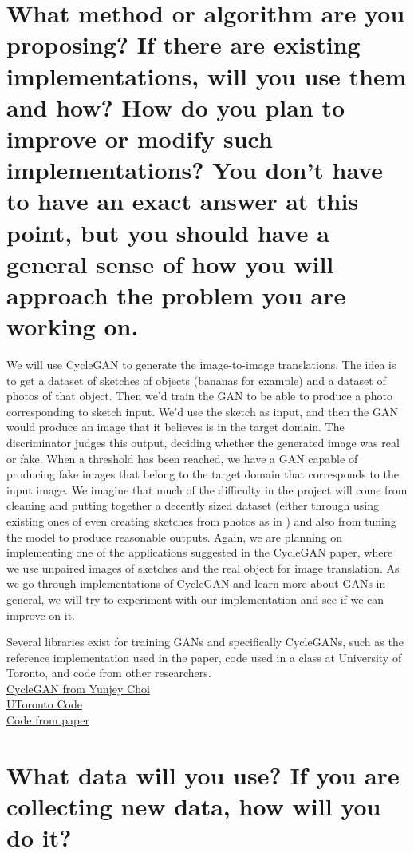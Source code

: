 \documentclass{article}
\begin{document}
\section{What method or algorithm are you proposing? If there are existing implementations, will you use them and how? How do you plan to improve or modify such implementations? You don't have to have an exact answer at this point, but you should have a general sense of how you will approach the problem you are working on. }

We will use CycleGAN to generate the image-to-image translations.
The idea is to get a dataset of sketches of objects (bananas for example) and a dataset of photos of that object.
Then we'd train the GAN to be able to produce a photo corresponding to sketch input. 
We'd use the sketch as input, and then the GAN would produce an image that it believes is in the target domain. 
The discriminator judges this output, deciding whether the generated image was real or fake.
When a threshold has been reached, we have a GAN capable of producing fake images that belong to the target domain that corresponds to the input image.
We imagine that much of the difficulty in the project will come from cleaning and putting together a decently sized dataset (either through using existing ones of even creating sketches from photos as in \cite{pix2pix}) and also from tuning the model to produce reasonable outputs.
Again, we are planning on implementing one of the applications suggested in the CycleGAN paper, where we use unpaired images of sketches and the real object for image translation.
As we go through implementations of CycleGAN and learn more about GANs in general, we will try to experiment with our implementation and see if we can improve on it.

Several libraries exist for training GANs and specifically CycleGANs, such as the reference implementation used in the paper, code used in a class at University of Toronto, and code from other researchers. \\
\href{https://github.com/yunjey/mnist-svhn-transfer}{CycleGAN from Yunjey Choi} \\
\href{www.cs.toronto.edu/~rgrosse/courses/csc321_2018/assignments/a4-code.zip}{UToronto Code} \\
\href{https://github.com/junyanz/pytorch-CycleGAN-and-pix2pix}{Code from paper} \\

\section{What data will you use? If you are collecting new data, how will you do it?}
\end{document}
